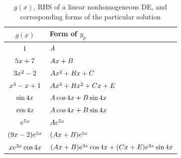 \begin{table}[b]
    \centering
    \begin{tabular}{cl}
        \toprule
        $g(x)$ & Form of $y_p$ \\
        \midrule
        $\cramped{1              }$ & $\cramped{A                                                }$\\
        $\cramped{5x + 7         }$ & $\cramped{Ax + B                                           }$\\
        $\cramped{3x^2 - 2       }$ & $\cramped{Ax^2 + Bx + C                                    }$\\
        $\cramped{x^3 -x + 1     }$ & $\cramped{Ax^3 + Bx^2 + Cx + E                             }$\\
        $\cramped{\sin 4x        }$ & $\cramped{A\cos 4x + B \sin 4x                             }$\\
        $\cramped{\cos 4x        }$ & $\cramped{A\cos 4x + B \sin 4x                             }$\\
        $\cramped{e^{5x}         }$ & $\cramped{Ae^{5x}                                          }$\\
        $\cramped{(9x - 2)e^{5x} }$ & $\cramped{(Ax + B) e^{5x}                                  }$\\
        $\cramped{xe^{3x} \cos 4x}$ & $\cramped{(Ax + B) e^{3x} \cos 4x + (Cx + E)e^{3x}  \sin 4x}$\\ 
        \bottomrule
    \end{tabular}
    \caption{$g(x)$, RHS of a linear nonhomogeneous DE, and corresponding forms of the particular solution}
    \label{tab:useful-form-map-y_p-gx}
\end{table}

